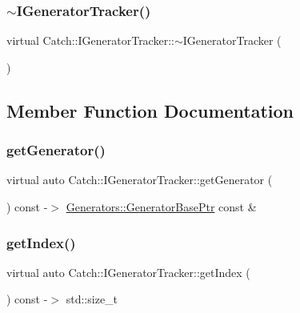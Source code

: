 \subsubsection{\texorpdfstring{$\sim$\+I\+Generator\+Tracker()}{~IGeneratorTracker()}}
{\footnotesize\ttfamily virtual Catch\+::\+I\+Generator\+Tracker\+::$\sim$\+I\+Generator\+Tracker (\begin{DoxyParamCaption}{ }\end{DoxyParamCaption})\hspace{0.3cm}{\ttfamily [virtual]}}



\subsection{Member Function Documentation}
\mbox{\label{struct_catch_1_1_i_generator_tracker_a23be942fc51672598bfa02c678c3078a}} 
\subsubsection{\texorpdfstring{get\+Generator()}{getGenerator()}}
{\footnotesize\ttfamily virtual auto Catch\+::\+I\+Generator\+Tracker\+::get\+Generator (\begin{DoxyParamCaption}{ }\end{DoxyParamCaption}) const -\/$>$  \mbox{\hyperlink{namespace_catch_1_1_generators_a24d632802570d314c18d00a2ea5e33d1}{Generators\+::\+Generator\+Base\+Ptr}} const \&\hspace{0.3cm}{\ttfamily [pure virtual]}}

\mbox{\label{struct_catch_1_1_i_generator_tracker_a2922f0d8bc7a732079eadbda78e30f79}} 
\subsubsection{\texorpdfstring{get\+Index()}{getIndex()}}
{\footnotesize\ttfamily virtual auto Catch\+::\+I\+Generator\+Tracker\+::get\+Index (\begin{DoxyParamCaption}{ }\end{DoxyParamCaption}) const -\/$>$  std\+::size\+\_\+t\hspace{0.3cm}{\ttfamily [pure virtual]}}

